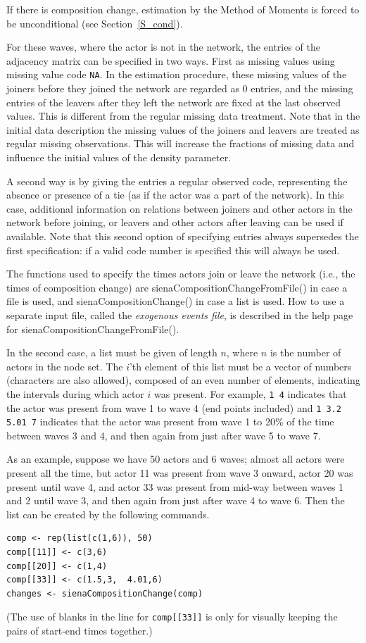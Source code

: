 \documentclass[a4paper,fleqn,11pt]{article}
\newcommand{\+}{\, + \,}
\newcommand{\sfn}[1]{\textsf{#1}}
\begin{document}
If there is composition change, estimation by the Method of Moments
is forced to be unconditional (see Section~\ref{S_cond}).

For these waves, where the actor is not in the network, the entries
of the adjacency matrix can be specified in two ways. First as
missing values using missing value code \texttt{NA}. In the estimation
procedure, these missing values of the joiners before they joined
the network are regarded as 0 entries, and the missing entries of
the leavers after they left the network are fixed at the last
observed values. This is different from the regular missing data
treatment. Note that in the initial data description the missing
values of the joiners and leavers are treated as regular missing
observations. This will increase the fractions of missing data and
influence the initial values of the density parameter.

A second way is by giving the entries a regular observed code,
representing the absence or presence of a tie (as
if the actor was a part of the network). In this case, additional
information on relations between joiners and other actors in the
network before joining, or leavers and other actors after leaving
can be used if available. Note that this second option of
specifying entries always supersedes the first specification: if a
valid code number is specified this will always be used.

The functions used to specify the times actors
join or leave the network (i.e., the times of composition change)
are \sfn{sienaCompositionChangeFromFile()} in case a file is used,
and \sfn{sienaCompositionChange()} in case a list is used.
How to use a separate input file,
called the \emph{exogenous events file}, is
described in the help page for \sfn{sienaCompositionChangeFromFile()}.

In the second case, a list must be given of length $n$,
where $n$ is the number of actors in the node set.
The $i$'th element of this list must be a vector of numbers (characters are also allowed),
composed of an even number of elements, indicating the intervals during
which actor $i$ was present. For example, \texttt{1 4} indicates that the actor
was present from wave 1 to wave 4 (end points included) and
\texttt{1 3.2 5.01 7}
indicates that the actor was present from wave 1 to 20\% of the time between
waves 3 and 4, and then again from just after wave 5 to wave 7.

As an example, suppose we have 50 actors and 6 waves;
almost all actors were present all the time, but actor 11 was present
from wave 3 onward, actor 20 was present until wave 4, and
actor 33 was present from mid-way between waves 1 and 2 until wave 3, and then
again from just after wave 4 to wave 6.
Then the list can be created by the following commands.
\begin{verbatim}
comp <- rep(list(c(1,6)), 50)
comp[[11]] <- c(3,6)
comp[[20]] <- c(1,4)
comp[[33]] <- c(1.5,3,  4.01,6)
changes <- sienaCompositionChange(comp)
\end{verbatim}
(The use of blanks in the line for \texttt{comp[[33]]} is only for visually
keeping the pairs of start-end times together.)
\end{document}
